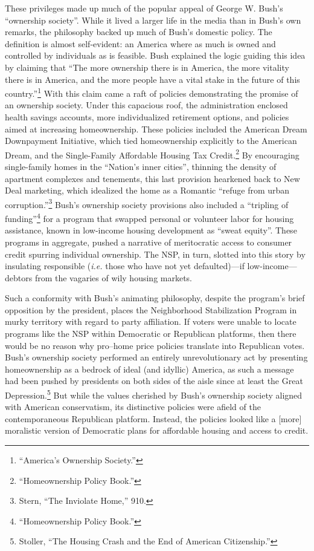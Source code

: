 \documentclass[
]{article}
\let\rmarkdownfootnote\footnote%
\def\footnote{\protect\rmarkdownfootnote}
\begin{document}
These privileges made up much of the popular appeal of George W. Bush's
``ownership society''. While it lived a larger life in the media than in
Bush's own remarks, the philosophy backed up much of Bush's domestic
policy. The definition is almost self-evident: an America where as much
is owned and controlled by individuals as is feasible. Bush explained
the logic guiding this idea by claiming that ``The more ownership there
is in America, the more vitality there is in America, and the more
people have a vital stake in the future of this country.''\footnote{``America's
  Ownership Society.''} With this claim came a raft of policies
demonstrating the promise of an ownership society. Under this capacious
roof, the administration enclosed health savings accounts, more
individualized retirement options, and policies aimed at increasing
homeownership. These policies included the American Dream Downpayment
Initiative, which tied homeownership explicitly to the American Dream,
and the Single-Family Affordable Housing Tax Credit.\footnote{``Homeownership
  Policy Book.''} By encouraging single-family homes in the ``Nation's
inner cities'', thinning the density of apartment complexes and
tenements, this last provision hearkened back to New Deal marketing,
which idealized the home as a Romantic ``refuge from urban
corruption.''\footnote{Stern, ``The Inviolate Home,'' 910.} Bush's
ownership society provisions also included a ``tripling of
funding''\footnote{``Homeownership Policy Book.''} for a program that
swapped personal or volunteer labor for housing assistance, known in
low-income housing development as ``sweat equity''. These programs in
aggregate, pushed a narrative of meritocratic access to consumer credit
spurring individual ownership. The NSP, in turn, slotted into this story
by insulating responsible (\emph{i.e.} those who have not yet
defaulted)---if low-income---debtors from the vagaries of wily housing
markets.

Such a conformity with Bush's animating philosophy, despite the
program's brief opposition by the president, places the Neighborhood
Stabilization Program in murky territory with regard to party
affiliation. If voters were unable to locate programs like the NSP
within Democratic or Republican platforms, then there would be no reason
why pro--home price policies translate into Republican votes. Bush's
ownership society performed an entirely unrevolutionary act by
presenting homeownership as a bedrock of ideal (and idyllic) America, as
such a message had been pushed by presidents on both sides of the aisle
since at least the Great Depression.\footnote{Stoller, ``The Housing
  Crash and the End of American Citizenship.''} But while the values
cherished by Bush's ownership society aligned with American
conservatism, its distinctive policies were afield of the
contemporaneous Republican platform. Instead, the policies looked like a
{[}more{]} moralistic version of Democratic plans for affordable housing
and access to credit.
\end{document}
